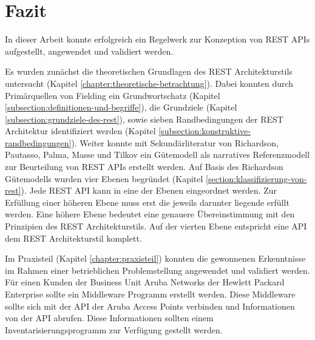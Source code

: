 \chapter{Fazit}\label{chapter:fazit}

In dieser Arbeit konnte erfolgreich ein Regelwerk zur Konzeption von REST APIs aufgestellt, angewendet und validiert werden.

Es wurden zunächst die theoretischen Grundlagen des REST Architekturstils untersucht (Kapitel \ref{chapter:theoretische-betrachtung}). Dabei konnten durch Primärquellen von Fielding ein Grundwortschatz (Kapitel \ref{subsection:definitionen-und-begriffe}), die Grundziele (Kapitel \ref{subsection:grundziele-des-rest}), sowie sieben Randbedingungen der REST Architektur identifiziert werden (Kapitel \ref{subsection:konstruktive-randbedingungen}). Weiter konnte mit Sekundärliteratur von Richardson, Pautasso, Palma, Masse und Tilkov ein Gütemodell als narratives Referenzmodell zur Beurteilung von REST APIs erstellt werden. Auf Basis des Richardson Gütemodells wurden vier Ebenen begründet (Kapitel \ref{section:klassifizierung-von-rest}).  Jede REST API kann in eine der Ebenen eingeordnet werden. Zur Erfüllung einer höheren Ebene muss erst die jeweils darunter liegende erfüllt werden. Eine höhere Ebene bedeutet eine genauere Übereinstimmung mit den Prinzipien des REST Architekturstils. Auf der vierten Ebene entspricht eine API dem REST Architekturstil komplett.

Im Praxisteil (Kapitel \ref{chapter:praxisteil}) konnten die gewonnenen Erkenntnisse im Rahmen einer betrieblichen Problemstellung angewendet und validiert werden. Für einen Kunden der Business Unit Aruba Networks der Hewlett Packard Enterprise sollte ein Middleware Programm erstellt werden. Diese Middleware sollte sich mit der API der Aruba Access Points verbinden und Informationen von der API abrufen. Diese Informationen sollten einem Inventarisierungsprogramm zur Verfügung gestellt werden.

